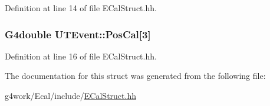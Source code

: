 Definition at line 14 of file E\-Cal\-Struct.\-hh.

\hypertarget{struct_u_t_event_ac7679fd27bb05442592f26f0039bb6ea}{
\subsubsection[{Pos\-Cal}]{\setlength{\rightskip}{0pt plus 5cm}G4double U\-T\-Event\-::\-Pos\-Cal\mbox{[}3\mbox{]}}}\label{struct_u_t_event_ac7679fd27bb05442592f26f0039bb6ea}


Definition at line 16 of file E\-Cal\-Struct.\-hh.



The documentation for this struct was generated from the following file\-:\begin{DoxyCompactItemize}
\item 
g4work/\-Ecal/include/\hyperlink{_e_cal_struct_8hh}{E\-Cal\-Struct.\-hh}\end{DoxyCompactItemize}
